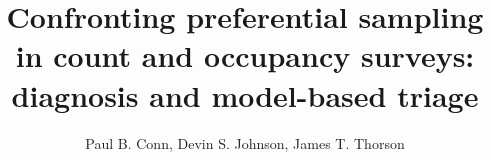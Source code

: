 \documentclass[times,mee,doublespace,]{besauth2}
\begin{document}


\title{Confronting preferential sampling in count and occupancy surveys: diagnosis and model-based triage \footnotemark[2]}

\author{Paul B. Conn\corrauth, Devin S. Johnson, James T. Thorson}


\address{National Marine Mammal Laboratory, Alaska Fisheries Science Center, NOAA National Marine Fisheries Service, 7600 Sand Point Way NE, Seattle, WA 98115 USA;  Fisheries Resource Assessment and Monitoring Division (FRAM), Northwest Fisheries Science Center, National Marine Fisheries Service (NMFS),
NOAA, 2725 Montlake Boulevard E, Seattle, WA 98112, USA}

\end{document}
